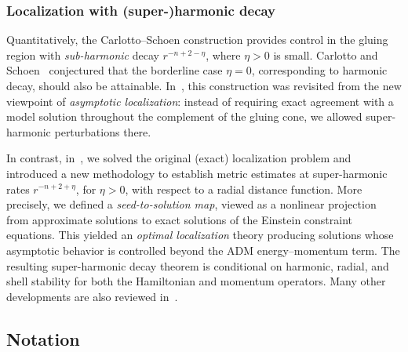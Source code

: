 \documentclass[11pt]{article}
\numberwithin{table}{section}
\numberwithin{equation}{section}
\numberwithin{table}{section}
\numberwithin{figure}{section}
\begin{document}

\subsubsection{Localization with (super-)harmonic decay} 

Quantitatively, the Carlotto--Schoen construction provides control in the gluing region with \emph{sub-harmonic} decay $r^{-n+2-\eta}$, where $\eta>0$ is small. Carlotto and Schoen~\cite{CarlottoSchoen,Carlotto-Review} conjectured that the borderline case $\eta=0$, corresponding to harmonic decay, should also be attainable.
In~\cite{LeFlochNguyen}, this construction was revisited from the new viewpoint of \emph{asymptotic localization}: instead of requiring exact agreement with a model solution throughout the complement of the gluing cone, we allowed super-harmonic perturbations there.

In contrast, in~\cite{LL-optimal-main}, we solved the original (exact) localization problem and introduced a new methodology to establish metric estimates at super-harmonic rates $r^{-n+2+\eta}$, for $\eta>0$, with respect to a radial distance function. More precisely, we defined a \emph{seed-to-solution map}, viewed as a nonlinear projection from approximate solutions to exact solutions of the Einstein constraint equations. This yielded an \emph{optimal localization} theory producing solutions whose asymptotic behavior is controlled beyond the ADM energy--momentum term. The resulting super-harmonic decay theorem is conditional on harmonic, radial, and shell stability for both the Hamiltonian and momentum operators. Many other developments are also reviewed in~\cite{LL-optimal-main}.


\subsection{Notation}
\label{sectionN1-5}
\end{document}
